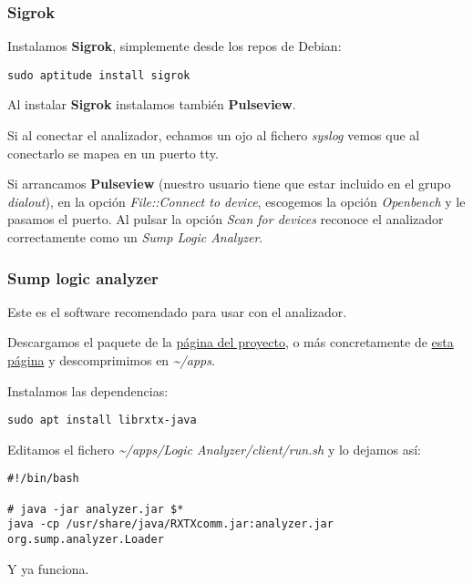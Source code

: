 \documentclass[
  12pt,
  spanish,
]{article}
\begin{document}
\hypertarget{sigrok}{%
\subsubsection{Sigrok}\label{sigrok}}

Instalamos \textbf{Sigrok}, simplemente desde los repos de Debian:

\begin{verbatim}
sudo aptitude install sigrok
\end{verbatim}

Al instalar \textbf{Sigrok} instalamos también \textbf{Pulseview}.

Si al conectar el analizador, echamos un ojo al fichero \emph{syslog}
vemos que al conectarlo se mapea en un puerto tty.

Si arrancamos \textbf{Pulseview} (nuestro usuario tiene que estar
incluido en el grupo \emph{dialout}), en la opción \emph{File::Connect
to device}, escogemos la opción \emph{Openbench} y le pasamos el puerto.
Al pulsar la opción \emph{Scan for devices} reconoce el analizador
correctamente como un \emph{Sump Logic Analyzer}.

\hypertarget{sump-logic-analyzer}{%
\subsubsection{Sump logic analyzer}\label{sump-logic-analyzer}}

Este es el software recomendado para usar con el analizador.

Descargamos el paquete de la \href{https://www.sump.org}{página del
proyecto}, o más concretamente de
\href{https://www.sump.org/projects/analyzer/}{esta página} y
descomprimimos en \emph{\textasciitilde/apps}.

Instalamos las dependencias:

\begin{verbatim}
sudo apt install librxtx-java
\end{verbatim}

Editamos el fichero \emph{\textasciitilde/apps/Logic
Analyzer/client/run.sh} y lo dejamos así:

\begin{verbatim}
#!/bin/bash

# java -jar analyzer.jar $*
java -cp /usr/share/java/RXTXcomm.jar:analyzer.jar org.sump.analyzer.Loader
\end{verbatim}

Y ya funciona.
\end{document}
